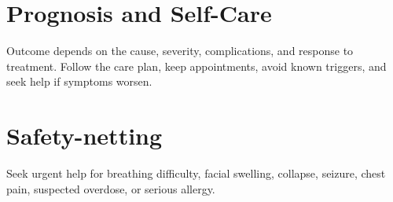 \section*{Prognosis and Self-Care}
Outcome depends on the cause, severity, complications, and response to treatment. Follow the care plan, keep appointments, avoid known triggers, and seek help if symptoms worsen.
\section*{Safety-netting}
Seek urgent help for breathing difficulty, facial swelling, collapse, seizure, chest pain, suspected overdose, or serious allergy.
